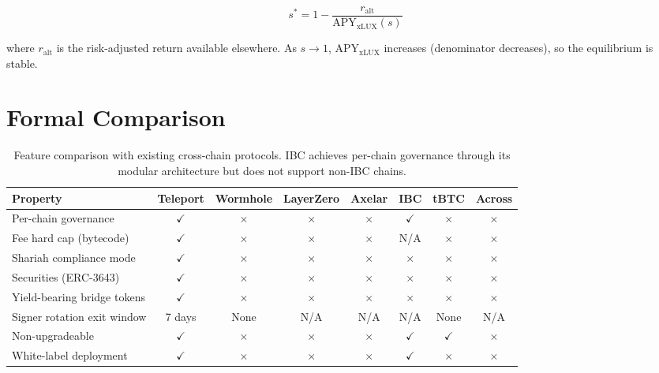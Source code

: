 \documentclass[11pt,twocolumn]{article}
\theoremstyle{definition}
\begin{document}
\begin{equation}
  s^* = 1 - \frac{r_{\text{alt}}}{\text{APY}_{\text{xLUX}}(s)}
\end{equation}

where $r_{\text{alt}}$ is the risk-adjusted return available elsewhere. As $s \to 1$, $\text{APY}_{\text{xLUX}}$ increases (denominator decreases), so the equilibrium is stable.

\section{Formal Comparison}
\label{sec:comparison}

\begin{table}[t]
\centering
\small
\begin{tabular}{@{}lccccccc@{}}
\toprule
\textbf{Property} & \textbf{Teleport} & \textbf{Wormhole} & \textbf{LayerZero} & \textbf{Axelar} & \textbf{IBC} & \textbf{tBTC} & \textbf{Across} \\
\midrule
Per-chain governance & $\checkmark$ & $\times$ & $\times$ & $\times$ & $\checkmark$ & $\times$ & $\times$ \\
Fee hard cap (bytecode) & $\checkmark$ & $\times$ & $\times$ & $\times$ & N/A & $\times$ & $\times$ \\
Shariah compliance mode & $\checkmark$ & $\times$ & $\times$ & $\times$ & $\times$ & $\times$ & $\times$ \\
Securities (ERC-3643) & $\checkmark$ & $\times$ & $\times$ & $\times$ & $\times$ & $\times$ & $\times$ \\
Yield-bearing bridge tokens & $\checkmark$ & $\times$ & $\times$ & $\times$ & $\times$ & $\times$ & $\times$ \\
Signer rotation exit window & 7 days & None & N/A & N/A & N/A & None & N/A \\
Non-upgradeable & $\checkmark$ & $\times$ & $\times$ & $\times$ & $\checkmark$ & $\checkmark$ & $\times$ \\
White-label deployment & $\checkmark$ & $\times$ & $\times$ & $\times$ & $\checkmark$ & $\times$ & $\times$ \\
\bottomrule
\end{tabular}
\caption{Feature comparison with existing cross-chain protocols. IBC achieves per-chain governance through its modular architecture but does not support non-IBC chains.}
\label{tab:comparison}
\end{table}
\end{document}
